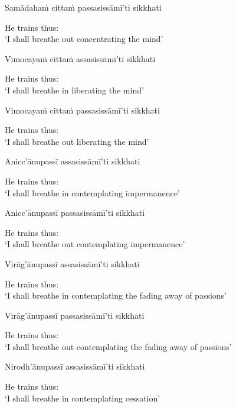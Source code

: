 Samādahaṁ cittaṁ passasissāmī'ti sikkhati

\begin{english}
  He trains thus:\\
  `I shall breathe out concentrating the mind'
\end{english}

Vimocayaṁ cittaṁ assasissāmī'ti sikkhati

\begin{english}
  He trains thus:\\
  `I shall breathe in liberating the mind'
\end{english}

Vimocayaṁ cittaṁ passasissāmī'ti sikkhati

\begin{english}
  He trains thus:\\
  `I shall breathe out liberating the mind'
\end{english}

Anicc'ānupassī assasissāmī'ti sikkhati

\begin{english}
  He trains thus:\\
  `I shall breathe in contemplating impermanence'
\end{english}

Anicc'ānupassī passasissāmī'ti sikkhati

\begin{english}
  He trains thus:\\
  `I shall breathe out contemplating impermanence'
\end{english}

Virāg'ānupassī assasissāmī'ti sikkhati

\begin{english}
  He trains thus:\\
  `I shall breathe in contemplating the fading away of passions'
\end{english}

Virāg'ānupassī passasissāmī'ti sikkhati

\begin{english}
  He trains thus:\\
  `I shall breathe out contemplating the fading away of passions'
\end{english}

Nirodh'ānupassī assasissāmī'ti sikkhati

\begin{english}
  He trains thus:\\
  `I shall breathe in contemplating cessation'
\end{english}

